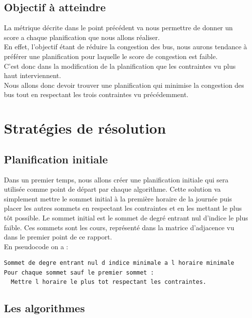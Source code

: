 \documentclass[a4paper,11pt]{article}
\begin{document}
	\subsection{Objectif à atteindre}
		La métrique décrite dans le point précédent va nous permettre de donner un score a chaque planification que nous allons réaliser.\\
		En effet, l'objectif étant de réduire la congestion des bus, nous aurons tendance à préférer une planification pour laquelle le score de congestion est faible.\\
		C'est donc dans la modification de la planification que les contraintes vu plus haut interviennent.\\
		Nous allons donc devoir trouver une planification qui minimise la congestion des bus tout en respectant les trois contraintes vu précédemment.
	
\section{Stratégies de résolution}
	\subsection{Planification initiale}
		Dans un premier temps, nous allons créer une planification initiale qui sera utilisée comme point de départ par chaque algorithme. Cette solution va simplement mettre le sommet initial à la première horaire de la journée puis placer les autres sommets en respectant les contraintes et en les mettant le plus tôt possible. Le sommet initial est le sommet de degré entrant nul d'indice le plus faible. Ces sommets sont les cours, représenté dans la matrice d'adjacence vu dans le premier point de ce rapport.\\
		En pseudocode on a :\\
		\begin{lstlisting}
Sommet de degre entrant nul d indice minimale a l horaire minimale
Pour chaque sommet sauf le premier sommet :
  Mettre l horaire le plus tot respectant les contraintes.
		\end{lstlisting}

	\subsection{Les algorithmes}
\end{document}
